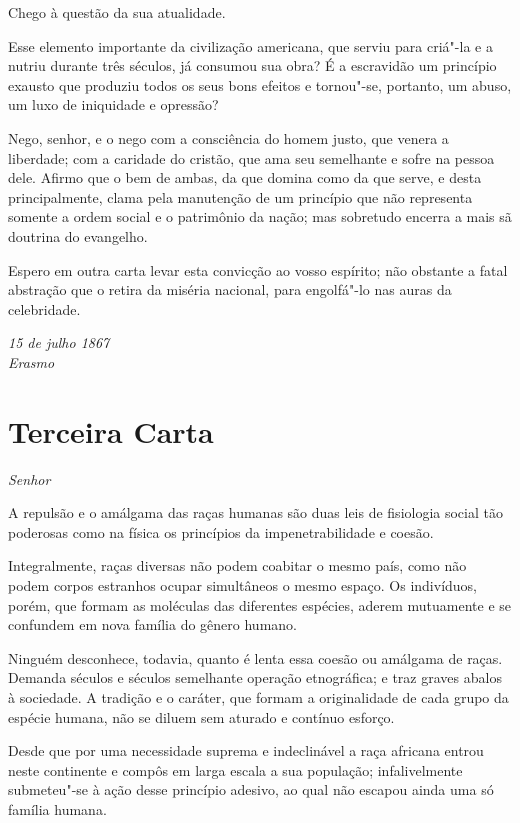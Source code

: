 Chego à questão da sua atualidade.

Esse elemento importante da civilização americana, que serviu para
criá"-la e a nutriu durante três séculos, já consumou sua obra? É a
escravidão um princípio exausto que produziu todos os seus bons efeitos
e tornou"-se, portanto, um abuso, um luxo de iniquidade e opressão?

Nego, senhor, e o nego com a consciência do homem justo, que venera a
liberdade; com a caridade do cristão, que ama seu semelhante e sofre na
pessoa dele. Afirmo que o bem de ambas, da que domina como da que
serve, e desta principalmente, clama pela manutenção de um princípio
que não representa somente a ordem social e o patrimônio da nação; mas
sobretudo encerra a mais sã doutrina do evangelho.

Espero em outra carta levar esta convicção ao vosso espírito; não
obstante a fatal abstração que o retira da miséria nacional, para
engolfá"-lo nas auras da celebridade.

\begin{flushright}
\textit{15 de julho 1867\\
Erasmo}
\end{flushright}

\chapter[Terceira Carta]{Terceira Carta }

\noindent\textit{Senhor}

\setcounter{@sectionNumCenter}{0}

\sectionitem

A repulsão e o amálgama das raças humanas são duas leis de fisiologia
social tão poderosas como na física os princípios da impenetrabilidade
e coesão.

Integralmente, raças diversas não podem coabitar o mesmo país, como não
podem corpos estranhos ocupar simultâneos o mesmo espaço. Os
indivíduos, porém, que formam as moléculas das diferentes espécies,
aderem mutuamente e se confundem em nova família do gênero humano. 

Ninguém desconhece, todavia, quanto é lenta essa coesão ou amálgama de
raças. Demanda séculos e séculos semelhante operação etnográfica; e
traz graves abalos à sociedade. A tradição e o caráter, que formam a
originalidade de cada grupo da espécie humana, não se diluem sem
aturado e contínuo esforço.

Desde que por uma necessidade suprema e indeclinável a raça africana
entrou neste continente e compôs em larga escala a sua população;
infalivelmente submeteu"-se à ação desse princípio adesivo, ao qual
não escapou ainda uma só família humana.

